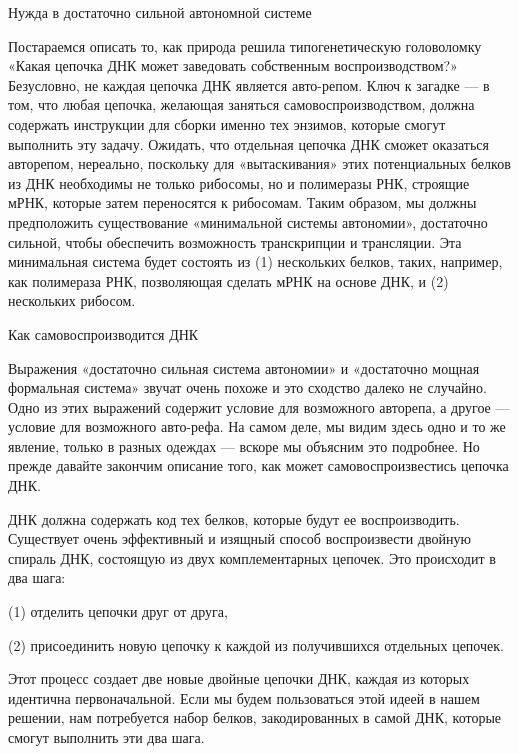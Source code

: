 Нужда в достаточно сильной автономной системе

Постараемся описать то, как природа решила типогенетическую головоломку «Какая цепочка ДНК может заведовать собственным воспроизводством?» Безусловно, не каждая цепочка ДНК является авто-репом. Ключ к загадке --- в том, что любая цепочка, желающая заняться самовоспроизводством, должна содержать инструкции для сборки именно тех энзимов, которые смогут выполнить эту задачу. Ожидать, что отдельная цепочка ДНК сможет оказаться авторепом, нереально, поскольку для «вытаскивания» этих потенциальных белков из ДНК необходимы не только рибосомы, но и полимеразы РНК, строящие мРНК, которые затем переносятся к рибосомам. Таким образом, мы должны предположить существование «минимальной системы автономии», достаточно сильной, чтобы обеспечить возможность транскрипции и трансляции. Эта минимальная система будет состоять из (1) нескольких белков, таких, например, как полимераза РНК, позволяющая сделать мРНК на основе ДНК, и (2) нескольких рибосом.

Как самовоспроизводится ДНК

Выражения «достаточно сильная система автономии» и «достаточно мощная формальная система» звучат очень похоже и это сходство далеко не случайно. Одно из этих выражений содержит условие для возможного авторепа, а другое --- условие для возможного авто-рефа. На самом деле, мы видим здесь одно и то же явление, только в разных одеждах --- вскоре мы объясним это подробнее. Но прежде давайте закончим описание того, как может самовоспроизвестись цепочка ДНК.

ДНК должна содержать код тех белков, которые будут ее воспроизводить. Существует очень эффективный и изящный способ воспроизвести двойную спираль ДНК, состоящую из двух комплементарных цепочек. Это происходит в два шага:

(1) отделить цепочки друг от друга,

(2) присоединить новую цепочку к каждой из получившихся отдельных цепочек.

Этот процесс создает две новые двойные цепочки ДНК, каждая из которых идентична первоначальной. Если мы будем пользоваться этой идеей в нашем решении, нам потребуется набор белков, закодированных в самой ДНК, которые смогут выполнить эти два шага.

